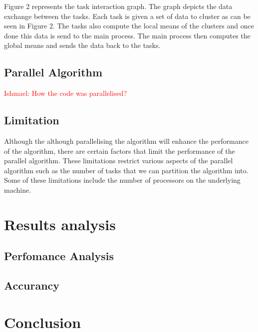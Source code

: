 \documentclass[12pt]{article}
\begin{document}
    			\begin{flushleft}
    				Figure 2 represents the task interaction graph. The graph depicts the data exchange between the tasks. Each task is given a set of data to cluster as can be seen in Figure 2. The tasks also compute the local means of the clusters and once done this data is send to the main process. The main process then computes the global means and sends the data back to the tasks.
    			\end{flushleft}
    	
    	\subsection{Parallel Algorithm}
    	\textcolor{red}{Ishmael: How the code was parallelised?}
    	
    	\subsection{Limitation}
 			\begin{flushleft}
 				Although the although parallelising the algorithm will enhance the performance of the algorithm, there are certain factors that limit the performance of the parallel algorithm. These limitations restrict various aspects of the parallel algorithm such as the number of tasks that we can partition the algorithm into. Some of these limitations include the number of processors on the underlying machine.
 			\end{flushleft}

  	\section{Results analysis}
    	\begin{flushleft}
			
    	\end{flushleft}
    	
    	\subsection{Perfomance Analysis}
    		\begin{flushleft}
    		
    		\end{flushleft}
    	
    	\subsection{Accurancy}
    		\begin{flushleft}
    			
    		\end{flushleft}

	\section{Conclusion}
    	\begin{flushleft}
			
    	\end{flushleft}
\end{document}
